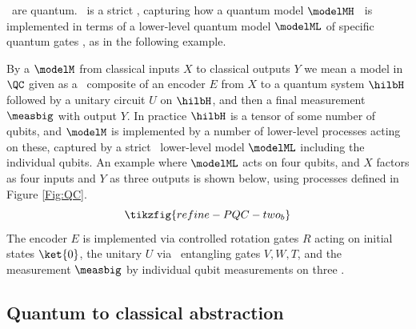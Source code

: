 \documentclass{article}
\begin{document}
\ are quantum. 
\ is a strict \strucdown{}, capturing how a quantum model $\modelMH$ \ is implemented in terms of a lower-level quantum model $\modelML$ of specific quantum gates , as in the following example. 

\begin{example} \label{ex:quantum-model-impl}
By a \emph{\qcircmodel{}} $\modelM$ from classical inputs $X$ to classical outputs $Y$ we mean a model in $\QC$ given as a \ composite of an encoder $E$ from $X$ to a quantum system $\hilbH$ 
followed by a unitary circuit $U$ on $\hilbH$, and then a final measurement $\measbig$ with output $Y$. In practice $\hilbH$ is a tensor of some number of qubits, and $\modelM$ is implemented by a number of lower-level processes acting on these, captured by a strict \strucdown{} \ lower-level model $\modelML$ including the individual qubits. An example where $\modelML$ acts on four qubits, and $X$ factors as four inputs and $Y$ as three outputs is shown below, using processes defined in Figure \ref{Fig:QC}.   
\[
\tikzfig{refine-PQC-two_b}
\]
The encoder $E$ is implemented via controlled rotation gates $R$ acting on initial states $\ket{0}$, the unitary $U$ via \ entangling gates $V,W,T$, and the measurement $\measbig$ by individual qubit measurements on three . 
\end{example}


\subsection{Quantum to classical abstraction} \label{sec:q-to-class-reduction}
\end{document}
